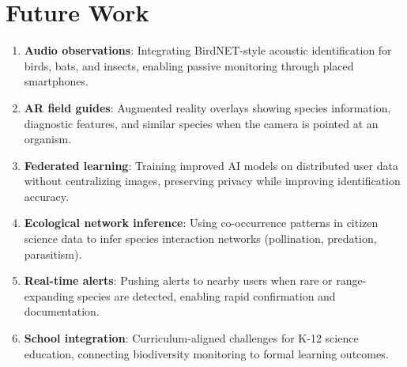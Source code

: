 \section{Future Work}

\label{sec:future}

\begin{enumerate}
  \item \textbf{Audio observations}: Integrating BirdNET-style acoustic
    identification for birds, bats, and insects, enabling passive
    monitoring through placed smartphones.

  \item \textbf{AR field guides}: Augmented reality overlays showing
    species information, diagnostic features, and similar species when
    the camera is pointed at an organism.

  \item \textbf{Federated learning}: Training improved AI models on
    distributed user data without centralizing images, preserving
    privacy while improving identification accuracy.

  \item \textbf{Ecological network inference}: Using co-occurrence
    patterns in citizen science data to infer species interaction
    networks (pollination, predation, parasitism).

  \item \textbf{Real-time alerts}: Pushing alerts to nearby users
    when rare or range-expanding species are detected, enabling rapid
    confirmation and documentation.

  \item \textbf{School integration}: Curriculum-aligned challenges for
    K-12 science education, connecting biodiversity monitoring to
    formal learning outcomes.
\end{enumerate}


